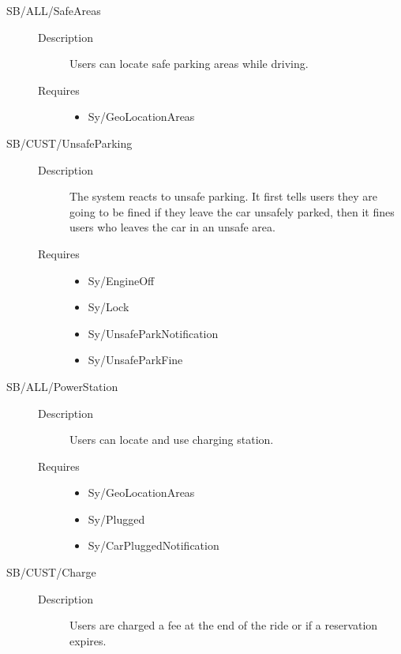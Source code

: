 \documentclass[11pt]{article} %
\begin{document}
\begin{description}
	\item[SB/ALL/SafeAreas] \hfill
	\begin{description}
		\item[Description] Users can locate safe parking areas while driving.
		\item[Requires] \hfill
		\begin{itemize}
			\item Sy/GeoLocationAreas %
		\end{itemize}
	\end{description}
	\item[SB/CUST/UnsafeParking] \hfill
	\begin{description}
		\item[Description] The system reacts to unsafe parking. It first tells users they are going to be fined if they leave the car unsafely parked, then it fines users who leaves the car in an unsafe area.
		\item[Requires] \hfill
		\begin{itemize}
			\item Sy/EngineOff %
			\item Sy/Lock %
			\item Sy/UnsafeParkNotification %
			\item Sy/UnsafeParkFine
		\end{itemize}
	\end{description}
	\item[SB/ALL/PowerStation] \hfill
	\begin{description}
		\item[Description] Users can locate and use charging station.
		\item[Requires] \hfill
		\begin{itemize}
			\item Sy/GeoLocationAreas %
			\item Sy/Plugged %
			\item Sy/CarPluggedNotification %
		\end{itemize}
	\end{description}
	\item[SB/CUST/Charge] \hfill
	\begin{description}
		\item[Description] Users are charged a fee at the end of the ride or if a reservation expires.

\end{description}
\end{description}
\end{document}
